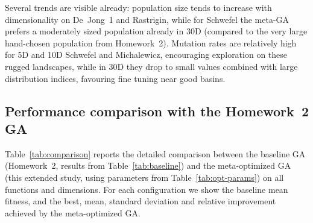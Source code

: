 \documentclass[11pt]{article}
\begin{document}
Several trends are visible already:
population size tends to increase with dimensionality on De~Jong~1 and
Rastrigin, while for Schwefel the meta-GA prefers a moderately sized
population already in 30D (compared to the very large hand-chosen population
from Homework~2).
Mutation rates are relatively high for 5D and 10D Schwefel and Michalewicz,
encouraging exploration on these rugged landscapes, while in 30D they drop
to small values combined with large distribution indices, favouring fine
tuning near good basins.

\subsection{Performance comparison with the Homework~2 GA}

Table~\ref{tab:comparison} reports the detailed comparison between the
baseline GA (Homework~2, results from Table~\ref{tab:baseline}) and the
meta-optimized GA (this extended study, using parameters from
Table~\ref{tab:opt-params}) on all functions and dimensions.
For each configuration we show the baseline mean fitness, and the best,
mean, standard deviation and relative improvement achieved by the
meta-optimized GA.
\end{document}
